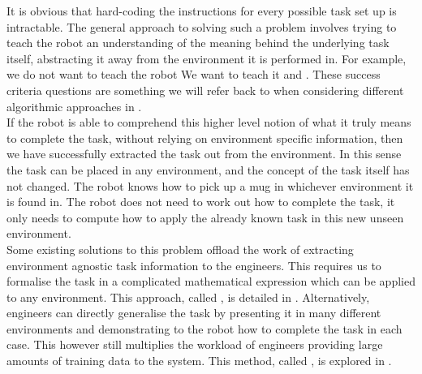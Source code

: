 It is obvious that hard-coding the instructions for every possible task set up is intractable. The general approach to solving such a problem involves trying to teach the robot an understanding of the meaning behind the underlying task itself, abstracting it away from the environment it is performed in. For example, we do not want to teach the robot  We want to teach it  and . These success criteria questions are something we will refer back to when considering different algorithmic approaches in .\\

If the robot is able to comprehend this higher level notion of what it truly means to complete the task, without relying on environment specific information, then we have successfully extracted the task out from the environment. In this sense the task can be placed in any environment, and the concept of the task itself has not changed. The robot knows how to pick up a mug in whichever environment it is found in. The robot does not need to work out how to complete the task, it only needs to compute how to apply the already known task in this new unseen environment.\\

Some existing solutions to this problem \cite{rl, rl-intro-book, inverse-rl, behavioural-cloning, rl-book, behavioural-cloning-book} offload the work of extracting environment agnostic task information to the engineers. This requires us to formalise the task in a complicated mathematical expression which can be applied to any environment. This approach, called , is detailed in . Alternatively, engineers can directly generalise the task by presenting it in many different environments and demonstrating to the robot how to complete the task in each case. This however still multiplies the workload of engineers providing large amounts of training data to the system. This method, called , is explored in . \\

